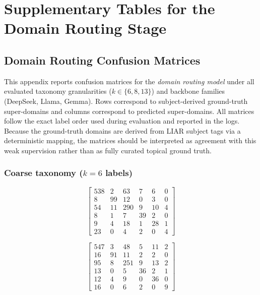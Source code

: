 \chapter{Supplementary Tables for the Domain Routing Stage}
\label{app:routing_tables}

\section{Domain Routing Confusion Matrices}
\label{app:confusion_matrices}

This appendix reports confusion matrices for the \emph{domain routing model} under all evaluated taxonomy granularities ($k\in\{6,8,13\}$) and backbone families (DeepSeek, Llama, Gemma).
Rows correspond to subject-derived ground-truth super-domains and columns correspond to predicted super-domains.
All matrices follow the exact label order used during evaluation and reported in the logs.
Because the ground-truth domains are derived from LIAR subject tags via a deterministic mapping, the matrices should be interpreted as agreement with this weak supervision rather than as fully curated topical ground truth.

\subsection{Coarse taxonomy ($k=6$ labels)}
\label{app:cm_k5}

\begin{table}[h]
\centering
\caption[DeepSeek domain routing confusion matrix for $k=6$.]{DeepSeek domain routing confusion matrix for $k=6$ (rows=true, cols=pred). Label order:
\texttt{[socioeconomic\_policy, foreign\_security, governance\_law, environment\_science, society\_culture, misc]}.}
\label{tab:domain_cm_deepseek_k5}
\small
\[
\begin{bmatrix}
538 & 2 & 63 & 7 & 6 & 0 \\
8 & 99 & 12 & 0 & 3 & 0 \\
54 & 11 & 290 & 9 & 10 & 4 \\
8 & 1 & 7 & 39 & 2 & 0 \\
9 & 4 & 18 & 1 & 28 & 1 \\
23 & 0 & 4 & 2 & 0 & 4
\end{bmatrix}
\]
\normalsize
\end{table}

\begin{table}[h]
\centering
\caption[Llama domain routing confusion matrix for $k=6$.]{Llama domain routing confusion matrix for $k=6$ (rows=true, cols=pred). Label order:
\texttt{[socioeconomic\_policy, foreign\_security, governance\_law, environment\_science, society\_culture, misc]}.}
\label{tab:domain_cm_llama_k5}
\small
\[
\begin{bmatrix}
547 & 3 & 48 & 5 & 11 & 2 \\
16 & 91 & 11 & 2 & 2 & 0 \\
95 & 8 & 251 & 9 & 13 & 2 \\
13 & 0 & 5 & 36 & 2 & 1 \\
12 & 4 & 9 & 0 & 36 & 0 \\
16 & 0 & 6 & 2 & 0 & 9
\end{bmatrix}
\]
\normalsize
\end{table}

